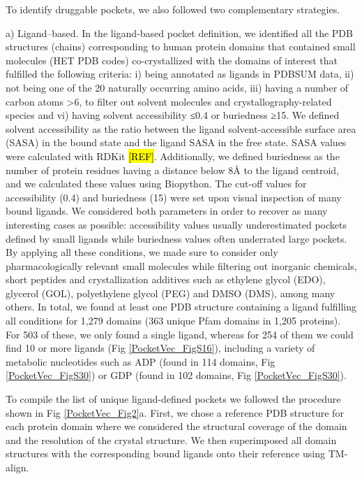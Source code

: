 To identify druggable pockets, we also followed two complementary strategies.

a) Ligand--based. In the ligand-based pocket definition, we identified all the PDB structures (chains) corresponding to human protein domains that contained small molecules (HET PDB codes) co-crystallized with the domains of interest that fulfilled the following criteria: i) being annotated as ligands in PDBSUM\cite{laskowski_pdbsum_2018} data, ii) not being one of the 20 naturally occurring amino acids, iii) having a number of carbon atoms >6, to filter out solvent molecules and crystallography-related species and vi) having solvent accessibility ≤0.4 or buriedness ≥15. We defined solvent accessibility as the ratio between the ligand solvent-accessible surface area (SASA) in the bound state and the ligand SASA in the free state. SASA values were calculated with RDKit \hl{[REF]}. Additionally, we defined buriedness as the number of protein residues having a distance below 8Å to the ligand centroid, and we calculated these values using Biopython\cite{cock_biopython_2009}. The cut-off values for accessibility (0.4) and buriedness (15) were set upon visual inspection of many bound ligands. We considered both parameters in order to recover as many interesting cases as possible: accessibility values usually underestimated pockets defined by small ligands while buriedness values often underrated large pockets. By applying all these conditions, we made sure to consider only pharmacologically relevant small molecules while filtering out inorganic chemicals, short peptides and crystallization additives such as ethylene glycol (EDO), glycerol (GOL), polyethylene glycol (PEG) and DMSO (DMS), among many others. In total, we found at least one PDB structure containing a ligand fulfilling all conditions for 1,279 domains (363 unique Pfam domains in 1,205 proteins). For 503 of these, we only found a single ligand, whereas for 254 of them we could find 10 or more ligands (Fig \ref{PocketVec_FigS16}), including a variety of metabolic nucleotides such as ADP (found in 114 domains, Fig \ref{PocketVec_FigS30}) or GDP (found in 102 domains, Fig \ref{PocketVec_FigS30}).

To compile the list of unique ligand-defined pockets we followed the procedure shown in Fig \ref{PocketVec_Fig2}a. First, we chose a reference PDB structure for each protein domain where we considered the structural coverage of the domain and the resolution of the crystal structure. We then superimposed all domain structures with the corresponding bound ligands onto their reference using TM-align\cite{zhang_tm-align_2005}. 

